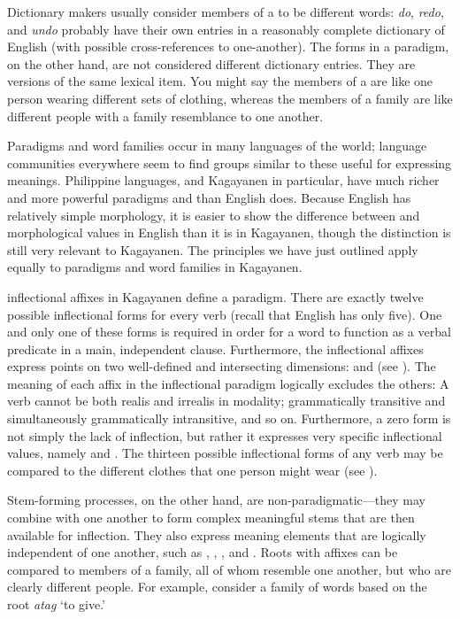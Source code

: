 Dictionary makers usually consider members of a  to be different words: \textit{do}, \textit{redo}, and \textit{undo} probably have their own entries in a reasonably complete dictionary of English (with possible cross-references to one-another). The forms in a paradigm, on the other hand, are not considered different dictionary entries. They are versions of the same lexical item. You might say the members of a  are like one person wearing different sets of clothing, whereas the members of a  family are like different people with a family resemblance to one another.

Paradigms and word families occur in many languages of the world; language communities everywhere seem to find groups similar to these useful for expressing meanings. Philippine languages, and Kagayanen in particular, have much richer and more powerful paradigms and  than English does. Because English has relatively simple morphology, it is easier to show the difference between  and  morphological values in English than it is in Kagayanen, though the distinction is still very relevant to Kagayanen. The principles we have just outlined apply equally to paradigms and word families in Kagayanen.

 inflectional affixes in Kagayanen define a paradigm. There are exactly twelve possible inflectional forms for every verb (recall that English has only five). One and only one of these forms is required in order for a word to function as a verbal predicate in a main, independent clause. Furthermore, the inflectional affixes express points on two well-defined and intersecting dimensions:  and  (see ). The meaning of each affix in the inflectional paradigm logically excludes the others: A verb cannot be both realis and irrealis in modality; grammatically transitive and simultaneously grammatically intransitive, and so on. Furthermore, a zero form is not simply the lack of inflection, but rather it expresses very specific inflectional values, namely  and . The thirteen possible inflectional forms of any verb may be compared to the different clothes that one person might wear (see ).

Stem-forming processes, on the other hand, are non-paradigmatic—they may combine with one another to form complex meaningful stems that are then available for inflection. They also express meaning elements that are logically independent of one another, such as , , ,  and . Roots with  affixes can be compared to members of a family, all of whom resemble one another, but who are clearly different people. For example, consider a family of words based on the root \textit{atag} ‘to give.’

